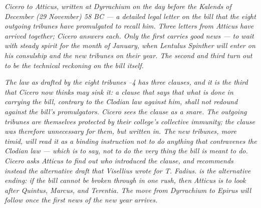 
\textit{Cicero to Atticus, written at Dyrrachium on the day
before the Kalends of December (29 November) 58 BC --- a
detailed legal letter on the bill that the eight outgoing
tribunes have promulgated to recall him. Three letters from
Atticus have arrived together; Cicero answers each. Only the
first carries good news --- to wait with steady spirit for the
month of January, when Lentulus Spinther will enter on his
consulship and the new tribunes on their year. The second and
third turn out to be the technical reckoning on the bill
itself.}

\textit{The law as drafted by the eight tribunes
--4 has three clauses, and it is the third that
Cicero now thinks may sink it: a clause that says that what is
done in carrying the bill, contrary to the Clodian law against
him, shall not redound against the bill's promulgators. Cicero
sees the clause as a snare. The outgoing tribunes are
themselves protected by their college's collective immunity;
the clause was therefore unnecessary for them, but written in.
The new tribunes, more timid, will read it as a binding
instruction not to do anything that contravenes the Clodian
law --- which is to say, not to do the very thing the bill is
meant to do. Cicero asks Atticus to find out who introduced
the clause, and recommends instead the alternative draft that
Visellius wrote for T. Fadius.  is the alternative
ending: if the bill cannot be broken through in one rush, then
Atticus is to look after Quintus, Marcus, and Terentia. The
move from Dyrrachium to Epirus will follow once the first
news of the new year arrives.}
